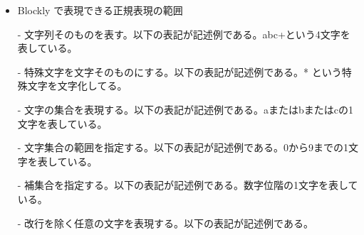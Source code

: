 \documentclass{eniepaper}
\begin{document}
\begin{itemize}

\item Blockly で表現できる正規表現の範囲

- 文字列そのものを表す。以下の表記が記述例である。abc+という4文字を表している。


- 特殊文字を文字そのものにする。以下の表記が記述例である。* という特殊文字を文字化してる。

\shadowbox{
\begin{minipage}[t]{3cm}
\begin{verbatim}
\*
\end{verbatim}
\end{minipage}
}

- 文字の集合を表現する。以下の表記が記述例である。aまたはbまたはcの1文字を表している。

\shadowbox{
\begin{minipage}[t]{3cm}
\begin{verbatim}
[abc]
\end{verbatim}
\end{minipage}
}

- 文字集合の範囲を指定する。以下の表記が記述例である。0から9までの1文字を表している。

\shadowbox{
\begin{minipage}[t]{3cm}
\begin{verbatim}
[0-9]
\end{verbatim}
\end{minipage}
}

- 補集合を指定する。以下の表記が記述例である。数字位階の1文字を表している。

\shadowbox{
\begin{minipage}[t]{3cm}
\begin{verbatim}
[^0-9]
\end{verbatim}
\end{minipage}
}

- 改行を除く任意の文字を表現する。以下の表記が記述例である。



\end{itemize}
\end{document}
